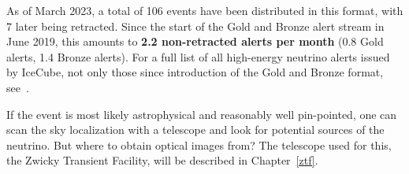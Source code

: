 As of March 2023, a total of 106 events have been distributed in this format, with 7 later being retracted. Since the start of the Gold and Bronze alert stream in June 2019, this amounts to \textbf{2.2 non-retracted alerts per month} (0.8 Gold alerts, 1.4 Bronze alerts). For a full list of all high-energy neutrino alerts issued by IceCube, not only those since introduction of the Gold and Bronze format, see~\cite{Abbasi2023}.

If the event is most likely astrophysical and reasonably well pin-pointed, one can scan the sky localization with a telescope and look for potential sources of the neutrino. But where to obtain optical images from? The telescope used for this, the Zwicky Transient Facility, will be described in Chapter~\ref{ztf}.



